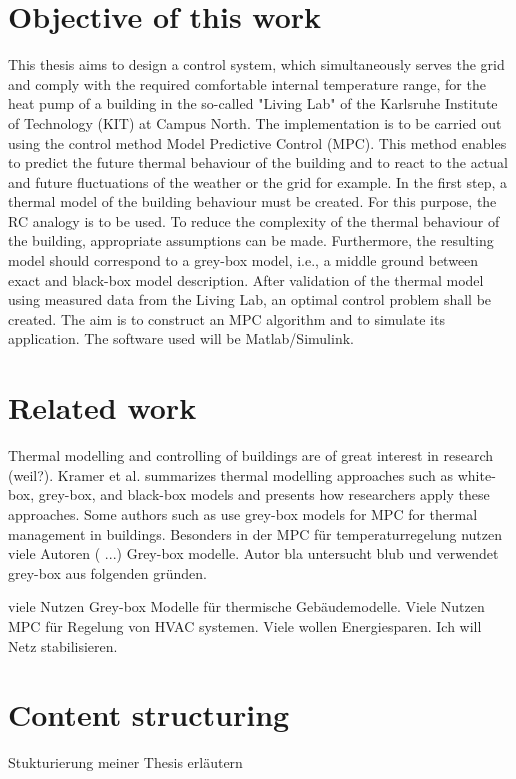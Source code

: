 \section{Objective of this work}
\label{section:obejective}
    This thesis aims to design a control system, which simultaneously serves the grid and comply with the required comfortable internal temperature range, for the heat pump of a building in the so-called "Living Lab" of the Karlsruhe Institute of Technology (KIT) at Campus North. The implementation is to be carried out using the control method Model Predictive Control (MPC). This method enables to predict the future thermal behaviour of the building and to react to the actual and future fluctuations of the weather or the grid for example. 
    In the first step, a thermal model of the building behaviour must be created. For this purpose, the RC analogy is to be used. To reduce the complexity of the thermal behaviour of the building, appropriate assumptions can be made. Furthermore, the resulting model should correspond to a grey-box model, i.e., a middle ground between exact and black-box model description. After validation of the thermal model using measured data from the Living Lab, an optimal control problem shall be created. The aim is to construct an MPC algorithm and to simulate its application. The software used will be Matlab/Simulink.

\section{Related work}
\label{section:relatedwork}

Thermal modelling and controlling of buildings are of great interest in research (weil?). Kramer et al. 
\cite{Kramer.2012}
summarizes thermal modelling approaches such as white-box, grey-box, and black-box models and presents how researchers apply these approaches. Some authors such as \cite{JiriCigler.} %
use grey-box models for MPC for thermal management in buildings. 
Besonders in der MPC für temperaturregelung nutzen viele Autoren ( ...) Grey-box modelle. Autor bla untersucht blub und verwendet grey-box aus folgenden gründen.





viele Nutzen Grey-box Modelle für thermische Gebäudemodelle. Viele Nutzen MPC für Regelung von HVAC systemen. Viele wollen Energiesparen. Ich will Netz stabilisieren.

\section{Content structuring}
\label{section:contentstructuring}
Stukturierung meiner Thesis erläutern